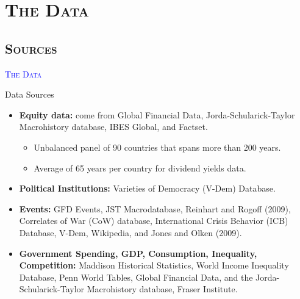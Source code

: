 

\section{\scshape The Data}

\subsection{\scshape Sources}


\begin{frame}[noframenumbering] 
	\begin{center}
		{ \Huge \textcolor{blue}{\scshape The Data \\
		}}
	\end{center}
\end{frame}

\begin{frame}{Data Sources}
	\begin{itemize}
		\item<1-> \textbf{Equity data:} come from Global Financial Data, Jorda-Schularick-Taylor Macrohistory database, IBES Global, and Factset.
		\begin{itemize}
			\vspace{.10cm}
			\item<1->[--] Unbalanced panel of 90 countries that spans more than 200 years.
			\vspace{.10cm}
			\item<1->[--] Average of 65 years per country for dividend yields data.
		\end{itemize}
		\vspace{.25cm}
		\item<2-> \textbf{Political Institutions:} Varieties of Democracy (V-Dem) Database.
		\vspace{.25cm}
		\item<3-> \textbf{Events:} GFD Events, JST Macrodatabase, Reinhart and Rogoff (2009), Correlates of War (CoW) database, International Crisis Behavior (ICB) Database, V-Dem, Wikipedia, and Jones and Olken (2009).
		\vspace{.25cm}
		\item<4-> \textbf{Government Spending, GDP, Consumption, Inequality, Competition:} Maddison Historical Statistics, World Income Inequality Database, Penn World Tables, Global Financial Data, and the Jorda-Schularick-Taylor Macrohistory database, Fraser Institute.
	\end{itemize}
	
\end{frame}


